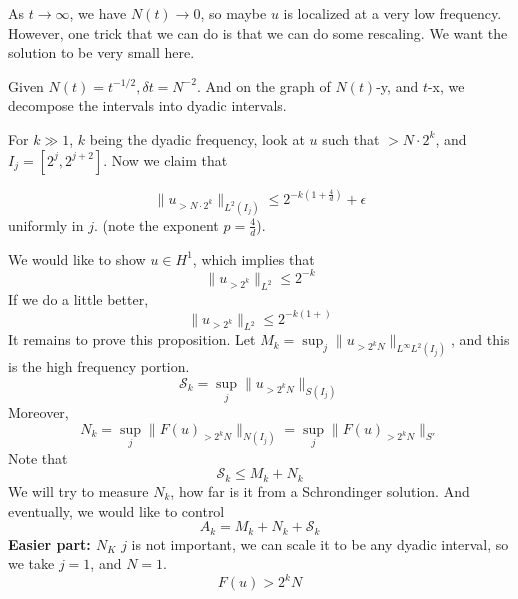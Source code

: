 As $t\to\infty$, we have $N(t)\to 0$, so maybe $u$ is localized at a very low frequency. However, one trick that we can do is that we can do some rescaling. We want the solution to be very small here.

Given $N(t)=t^{-1/2}, \delta t=N^{-2}$. And on the graph of $N(t)$-y, and $t$-x, we decompose the intervals into dyadic intervals.
\begin{comment}
    We will do a scaling. And push the control at infinity. We would like to magic this from a qualitative to a quantitative way.
\end{comment}
For $k\gg 1$, $k$ being the dyadic frequency, look at $u$ such that $>N\cdot 2^k$, and $I_j=[2^j, 2^{j+2}]$. Now we claim that 
\begin{proposition}
    \begin{equation*}
        \|u_{>N\cdot 2^k}\|_{L^2(I_j)}\leq 2^{-k(1+\frac{4}{d})}+\epsilon
    \end{equation*}
    uniformly in $j$. (note the exponent $p=\frac{4}{d}$).
\end{proposition}
We would like to show $u\in H^1$, which implies that 
\begin{equation*}
    \|u_{>2^k}\|_{L^2}\leq 2^{-k}
\end{equation*}
If we do a little better, 
\begin{equation*}
    \|u_{>2^k}\|_{L^2}\leq 2^{-k(1+)}
\end{equation*}
It remains to prove this proposition. Let $M_k=\sup_j\|u_{>2^kN}\|_{L^\infty L^2(I_j)}$, and this is the high frequency portion.
\begin{equation*}
    \mathcal{S}_k=\sup_j\|u_{>2^kN}\|_{S(I_j)}
\end{equation*}
Moreover,
\begin{equation*}
    N_k=\sup_j\|F(u)_{>2^kN}\|_{N(I_j)}=\sup_j\|F(u)_{>2^kN}\|_{S'}
\end{equation*}
Note that 
\begin{equation*}
    \mathcal{S}_k\leq M_k+N_k
\end{equation*}
We will try to measure $N_k$, how far is it from a Schrondinger solution. And eventually, we would like to control 
\begin{equation*}
    A_k=M_k+N_k+\mathcal{S}_k
\end{equation*}
\textbf{Easier part: $N_K$} $j$ is not important, we can scale it to be any dyadic interval, so we take $j=1$, and $N=1$.
\begin{equation*}
    F(u)>2^kN
\end{equation*}
